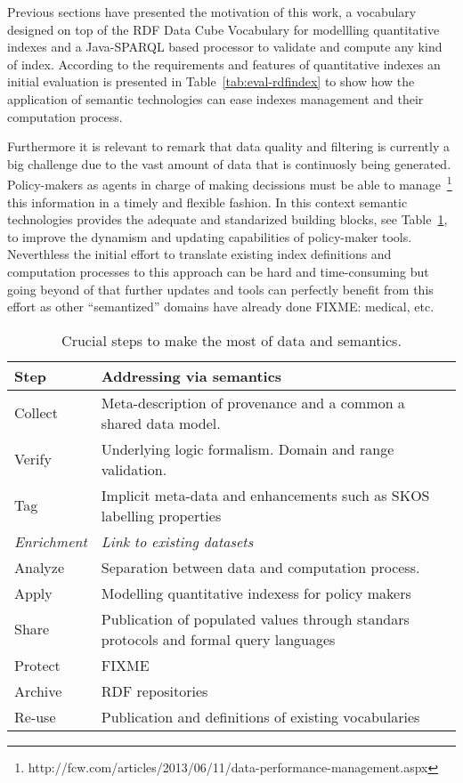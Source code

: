 Previous sections have presented the motivation of this work, a vocabulary designed on top of the 
RDF Data Cube Vocabulary for modellling quantitative indexes and a Java-SPARQL based processor 
to validate and compute any kind of index. According to the requirements and features 
of quantitative indexes an initial evaluation is presented in Table~\ref{tab:eval-rdfindex} to show 
how the application of semantic technologies can ease indexes management and their computation process.

Furthermore it is relevant to remark that data quality and filtering is currently a big challenge 
due to the vast amount of data that is continuosly being generated. Policy-makers as agents in charge 
of making decissions must be able to manage~\footnote{http://fcw.com/articles/2013/06/11/data-performance-management.aspx} 
this information in a timely and flexible fashion. In this context semantic technologies provides the adequate and standarized building blocks, see Table~\ref{tab:eval-steps}, 
to improve the dynamism and updating capabilities of policy-maker tools. Neverthless 
the initial effort to translate existing index definitions and computation processes to this approach can 
be hard and time-consuming but going beyond of that further updates and tools can perfectly benefit from this effort as 
other ``semantized'' domains have already done FIXME: medical, etc.


\begin{table}[!htb]
\renewcommand{\arraystretch}{1.3}
\begin{center}
\begin{tabular}{|p{3cm}|p{8cm}|}
\hline
  \textbf{Step} & \textbf{Addressing via semantics}  \\  \hline
  Collect & Meta-description of provenance and a common a shared data model. \\ \hline
  Verify & Underlying logic formalism. Domain and range validation. \\ \hline
  Tag & Implicit meta-data and enhancements such as SKOS labelling properties \\ \hline
  \textit{Enrichment} & \textit{Link to existing datasets} \\ \hline
  Analyze & Separation between data and computation process. \\ \hline  
  Apply & Modelling quantitative indexess for policy makers \\ \hline  
  Share & Publication of populated values through standars protocols and formal query languages  \\ \hline
  Protect & FIXME  \\ \hline
  Archive & RDF repositories \\ \hline
  Re-use &  Publication and definitions of existing vocabularies\\ \hline  
  \hline
  \end{tabular}
  \caption{Crucial steps to make the most of data and semantics.}
  \label{tab:eval-steps}
  \end{center}
\end{table} 




